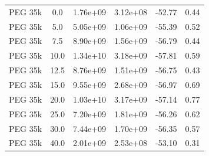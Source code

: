\begin{tabular}{lccccc}
PEG 35k & 0.0 & 1.76e+09 & 3.12e+08 & -52.77 & 0.44 \\
PEG 35k & 5.0 & 5.05e+09 & 1.06e+09 & -55.39 & 0.52 \\
PEG 35k & 7.5 & 8.90e+09 & 1.56e+09 & -56.79 & 0.44 \\
PEG 35k & 10.0 & 1.34e+10 & 3.18e+09 & -57.81 & 0.59 \\
PEG 35k & 12.5 & 8.76e+09 & 1.51e+09 & -56.75 & 0.43 \\
PEG 35k & 15.0 & 9.55e+09 & 2.68e+09 & -56.97 & 0.69 \\
PEG 35k & 20.0 & 1.03e+10 & 3.17e+09 & -57.14 & 0.77 \\
PEG 35k & 25.0 & 7.20e+09 & 1.81e+09 & -56.26 & 0.62 \\
PEG 35k & 30.0 & 7.44e+09 & 1.70e+09 & -56.35 & 0.57 \\
PEG 35k & 40.0 & 2.01e+09 & 2.53e+08 & -53.10 & 0.31 \\
\bottomrule
\end{tabular}
